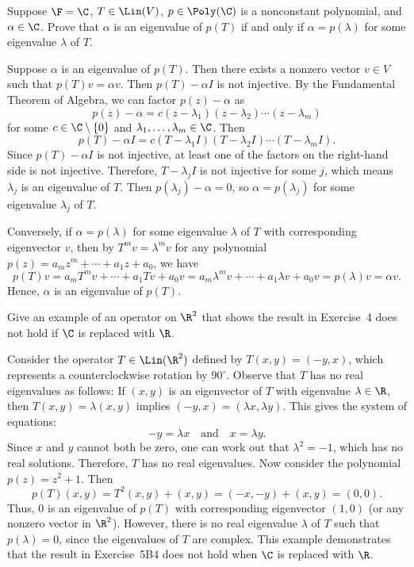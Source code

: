 \begin{exercise}
Suppose $\F=\C$, $T\in\Lin(V)$, $p\in\Poly(\C)$ is a nonconstant polynomial,
and $\alpha\in\C$. Prove that $\alpha$ is an eigenvalue of $p(T)$ if and only
if $\alpha=p(\lambda)$ for some eigenvalue $\lambda$ of $T$.
\end{exercise}
\begin{solution}
Suppose $\alpha$ is an eigenvalue of $p(T)$. Then there exists a nonzero
vector $v\in V$ such that $p(T)v=\alpha v$. Then $p(T)-\alpha I$ is not
injective. By the Fundamental Theorem of Algebra, we can factor $p(z)-\alpha$
as
\[ p(z)-\alpha=c(z-\lambda_1)(z-\lambda_2)\cdots(z-\lambda_m) \]
for some $c\in\C\setminus\{0\}$ and $\lambda_1,\dots,\lambda_m\in\C$. Then
\[ p(T)-\alpha I=c(T-\lambda_1I)(T-\lambda_2I)\cdots(T-\lambda_mI). \]
Since $p(T)-\alpha I$ is not injective, at least one of the factors on the
right-hand side is not injective. Therefore, $T-\lambda_jI$ is not injective
for some $j$, which means $\lambda_j$ is an eigenvalue of $T$. Then
$p(\lambda_j)-\alpha=0$, so $\alpha=p(\lambda_j)$ for some eigenvalue
$\lambda_j$ of $T$.

Conversely, if $\alpha=p(\lambda)$ for some eigenvalue $\lambda$ of $T$ with
corresponding eigenvector $v$, then by $T^mv=\lambda^mv$ for any polynomial
$p(z)=a_mz^m+\cdots+a_1z+a_0$, we have
\[ p(T)v=a_mT^mv+\cdots+a_1Tv+a_0v=a_m\lambda^mv+\cdots+a_1\lambda v+a_0v
   =p(\lambda)v=\alpha v. \]
Hence, $\alpha$ is an eigenvalue of $p(T)$.
\end{solution}

\begin{exercise}
Give an example of an operator on $\R^2$ that shows the result in Exercise~4
does not hold if $\C$ is replaced with $\R$.
\end{exercise}
\begin{solution}
Consider the operator $T\in\Lin(\R^2)$ defined by $T(x,y)=(-y,x)$, which
represents a counterclockwise rotation by $90^\circ$. Observe that $T$ has no
real eigenvalues as follows: If $(x,y)$ is an eigenvector of $T$ with
eigenvalue $\lambda\in\R$, then $T(x,y)=\lambda(x,y)$ implies
$(-y,x)=(\lambda x,\lambda y)$. This gives the system of equations:
\[ -y=\lambda x \quad\text{and}\quad x=\lambda y. \]
Since $x$ and $y$ cannot both be zero, one can work out that $\lambda^2=-1$,
which has no real solutions. Therefore, $T$ has no real eigenvalues. Now
consider the polynomial $p(z)=z^2+1$. Then
\[ p(T)(x,y)=T^2(x,y)+(x,y)=(-x,-y)+(x,y)=(0,0). \]
Thus, $0$ is an eigenvalue of $p(T)$ with corresponding eigenvector $(1,0)$
(or any nonzero vector in $\R^2$). However, there is no real eigenvalue
$\lambda$ of $T$ such that $p(\lambda)=0$, since the eigenvalues of $T$ are
complex. This example demonstrates that the result in Exercise~5B4 does not
hold when $\C$ is replaced with $\R$.
\end{solution}

